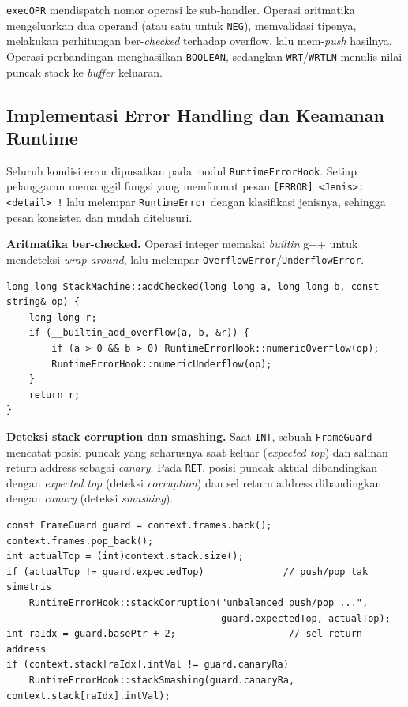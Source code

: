 \texttt{execOPR} mendispatch nomor operasi ke sub-handler. Operasi aritmatika
mengeluarkan dua operand (atau satu untuk \texttt{NEG}), memvalidasi tipenya,
melakukan perhitungan ber-\emph{checked} terhadap overflow, lalu mem-\emph{push}
hasilnya. Operasi perbandingan menghasilkan \texttt{BOOLEAN}, sedangkan
\texttt{WRT}/\texttt{WRTLN} menulis nilai puncak stack ke \emph{buffer} keluaran.

\subsection{Implementasi Error Handling dan Keamanan Runtime}

Seluruh kondisi error dipusatkan pada modul \texttt{RuntimeErrorHook}. Setiap
pelanggaran memanggil fungsi yang memformat pesan \texttt{[ERROR] <Jenis>: <detail> !}
lalu melempar \texttt{RuntimeError} dengan klasifikasi jenisnya, sehingga pesan
konsisten dan mudah ditelusuri.

\textbf{Aritmatika ber-checked.} Operasi integer memakai \emph{builtin} g++ untuk
mendeteksi \emph{wrap-around}, lalu melempar \texttt{OverflowError}/\texttt{UnderflowError}.

\begin{lstlisting}[style=kodeCpp, caption={Penjumlahan dengan deteksi overflow/underflow.}]
long long StackMachine::addChecked(long long a, long long b, const string& op) {
    long long r;
    if (__builtin_add_overflow(a, b, &r)) {
        if (a > 0 && b > 0) RuntimeErrorHook::numericOverflow(op);
        RuntimeErrorHook::numericUnderflow(op);
    }
    return r;
}
\end{lstlisting}

\textbf{Deteksi stack corruption dan smashing.} Saat \texttt{INT}, sebuah
\texttt{FrameGuard} mencatat posisi puncak yang seharusnya saat keluar
(\emph{expected top}) dan salinan return address sebagai \emph{canary}. Pada
\texttt{RET}, posisi puncak aktual dibandingkan dengan \emph{expected top} (deteksi
\emph{corruption}) dan sel return address dibandingkan dengan \emph{canary}
(deteksi \emph{smashing}).

\begin{lstlisting}[style=kodeCpp, caption={Verifikasi keseimbangan frame saat \texttt{RET}.}]
const FrameGuard guard = context.frames.back();
context.frames.pop_back();
int actualTop = (int)context.stack.size();
if (actualTop != guard.expectedTop)              // push/pop tak simetris
    RuntimeErrorHook::stackCorruption("unbalanced push/pop ...",
                                      guard.expectedTop, actualTop);
int raIdx = guard.basePtr + 2;                    // sel return address
if (context.stack[raIdx].intVal != guard.canaryRa)
    RuntimeErrorHook::stackSmashing(guard.canaryRa, context.stack[raIdx].intVal);
\end{lstlisting}

